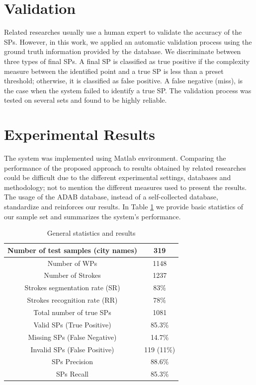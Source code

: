 \documentclass[10pt, conference, compsocconf]{IEEEtran}
\begin{document}
\section{Validation}
\label{sec:validation}
Related researches usually use a human expert to validate the accuracy of the SPs. However, in this work, we applied an automatic validation process using the ground truth information provided by the database. We discriminate between three types of final SPs. A final SP is classified as true positive if the complexity measure between the identified point and a true SP is less than a preset threshold; otherwise, it is classified as false positive. A false negative (miss), is the case when the system failed to identify a true SP.
The validation process was tested on several sets and found to be highly reliable.


\section{Experimental Results}
\label{sec:results}
The system was implemented using Matlab environment. 
Comparing the performance of the proposed approach to results obtained by related researches could be difficult due to the different experimental settings, databases and methodology; not to mention the different measures used to present the results. 
The usage of the ADAB database, instead of a self-collected database, standardize and reinforces our results. 
In Table \ref{table:general_stats_results} we provide basic statistics of our sample set and summarizes the system's performance.

\begin{table}[h]
\caption{General statistics and results}
\renewcommand{\arraystretch}{1.2}
\begin{tabular}{ | c | c | }
  \hline
  Number of test samples (city names) & 319 \\
  \hline
  Number of WPs & 1148 \\
  \hline
  Number of Strokes & 1237 \\
  \hline
  Strokes segmentation rate (SR) &  83\% \\ 
  \hline
  Strokes recognition rate (RR) &  78\% \\ 
 \hline
  Total number of true SPs & 1081 \\
  \hline
  Valid SPs (True Positive) & 85.3\% \\
    \hline
  Missing SPs (False Negative) & 14.7\% \\
  \hline
  Invalid SPs (False Positive) & 119 (11\%) \\
  \hline                                    
  SPs Precision & 88.6\% \\ 
 \hline
  SPs Recall &  85.3\% \\ 
  \hline
\end{tabular}
\centering
\label{table:general_stats_results} 
\end{table}
\end{document}
